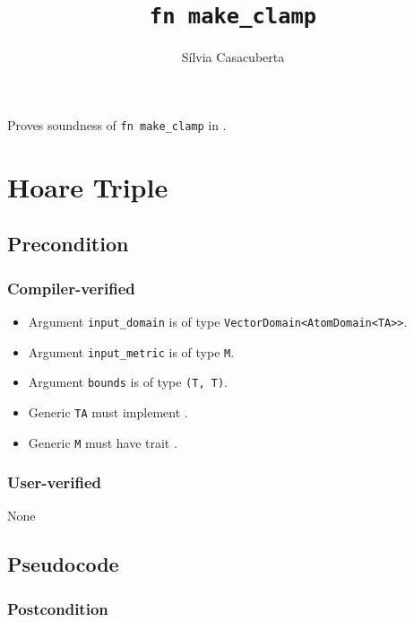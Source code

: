 \documentclass{article}
\title{\texttt{fn make\_clamp}}
\author{S\'ilvia Casacuberta}
\date{}
\begin{document}
 
 
\maketitle 
 
Proves soundness of \texttt{fn make\_clamp} in . 
 
\section{Hoare Triple} 
\subsection*{Precondition} 
 
\subsubsection*{Compiler-verified} 
\begin{itemize} 
    \item Argument \texttt{input\_domain} is of type \texttt{VectorDomain<AtomDomain<TA>{}>}. 
    \item Argument \texttt{input\_metric} is of type \texttt{M}. 
    \item Argument \texttt{bounds} is of type \texttt{(T, T)}. 
    \item Generic \texttt{TA} must implement . 
    \item Generic \texttt{M} must have trait . 
\end{itemize} 
 
\subsubsection*{User-verified} 
None 

\subsection*{Pseudocode} 
 
 
\subsubsection*{Postcondition} 
 
\end{document}
